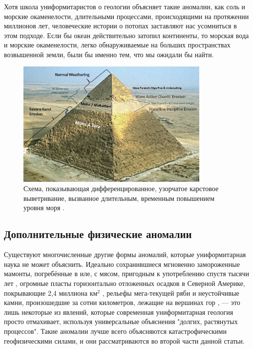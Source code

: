 \documentclass[10pt,twocolumn,letterpaper]{article}
\begin{document}
Хотя школа униформитаристов о геологии объясняет такие аномалии, как соль и морские окаменелости, длительными процессами, происходящими на протяжении миллионов лет, человеческие истории о потопах заставляют нас усомниться в этом подходе. Если бы океан действительно затопил континенты, то морская вода и морские окаменелости, легко обнаруживаемые на больших пространствах возвышенной земли, были бы именно тем, что мы ожидали бы найти.

\begin{figure}[t]
\begin{center}
\includegraphics[width=0.85\textwidth]{khafre.jpg}
\end{center}
   \caption{Схема, показывающая дифференцированное, узорчатое карстовое выветривание, вызванное длительным, временным повышением уровня моря \cite{27}.}
\label{fig:4}
\end{figure}

\subsection{Дополнительные физические аномалии}

Существуют многочисленные другие формы аномалий, которые униформитарная наука не может объяснить. Идеально сохранившиеся мгновенно замороженные мамонты, погребённые в иле, с мясом, пригодным к употреблению спустя тысячи лет \cite{17,18,19}, огромные пласты горизонтально отложенных осадков в Северной Америке, покрывающие 2,4 миллиона км$^2$ \cite{21}, рельефы мега-текущей ряби \cite{22} и неустойчивые камни, произошедшие за сотни километров, лежащие на вершинах гор \cite{23,26}, — это лишь некоторые из явлений, которые современная униформитарная геология просто отмахивает, используя универсальные объяснения "долгих, растянутых процессов". Такие аномалии лучше всего объясняются катастрофическими геофизическими силами, и они рассматриваются во второй части данной статьи.
\end{document}
